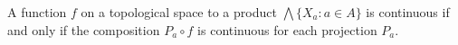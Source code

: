 A function $f$ on a topological space to a product $\bigwedge \{X_a : a \in A\}$ is continuous if and only if the composition $P_a \circ f$ is continuous for each projection $P_a$.
